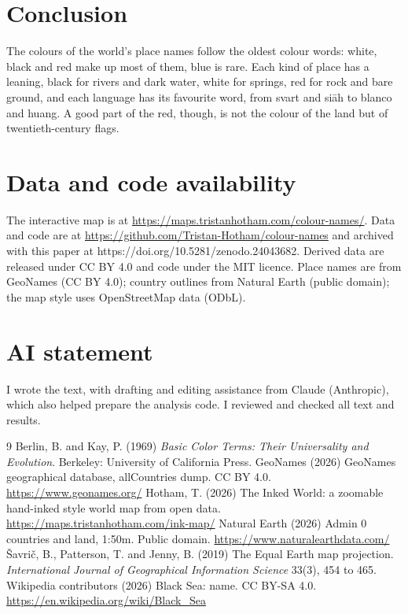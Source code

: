 \documentclass[11pt,a4paper]{article}
\begin{document}
\section{Conclusion}
The colours of the world's place names follow the oldest colour words: white, black and red make up most of them, blue is rare. Each kind of place has a leaning, black for rivers and dark water, white for springs, red for rock and bare ground, and each language has its favourite word, from svart and siāh to blanco and huang. A good part of the red, though, is not the colour of the land but of twentieth-century flags.

\section*{Data and code availability}
The interactive map is at \url{https://maps.tristanhotham.com/colour-names/}. Data and code are at \url{https://github.com/Tristan-Hotham/colour-names} and archived with this paper at https://doi.org/10.5281/zenodo.24043682. Derived data are released under CC BY 4.0 and code under the MIT licence. Place names are from GeoNames (CC BY 4.0); country outlines from Natural Earth (public domain); the map style uses OpenStreetMap data (ODbL).

\section*{AI statement}
I wrote the text, with drafting and editing assistance from Claude (Anthropic), which also helped prepare the analysis code. I reviewed and checked all text and results.

\begin{thebibliography}{9}
 Berlin, B. and Kay, P. (1969) \textit{Basic Color Terms: Their Universality and Evolution}. Berkeley: University of California Press.
 GeoNames (2026) GeoNames geographical database, allCountries dump. CC BY 4.0. \url{https://www.geonames.org/}
 Hotham, T. (2026) The Inked World: a zoomable hand-inked style world map from open data. \url{https://maps.tristanhotham.com/ink-map/}
 Natural Earth (2026) Admin 0 countries and land, 1:50m. Public domain. \url{https://www.naturalearthdata.com/}
 \v{S}avri\v{c}, B., Patterson, T. and Jenny, B. (2019) The Equal Earth map projection. \textit{International Journal of Geographical Information Science} 33(3), 454 to 465.
 Wikipedia contributors (2026) Black Sea: name. CC BY-SA 4.0. \url{https://en.wikipedia.org/wiki/Black_Sea}
\end{thebibliography}
\end{document}
